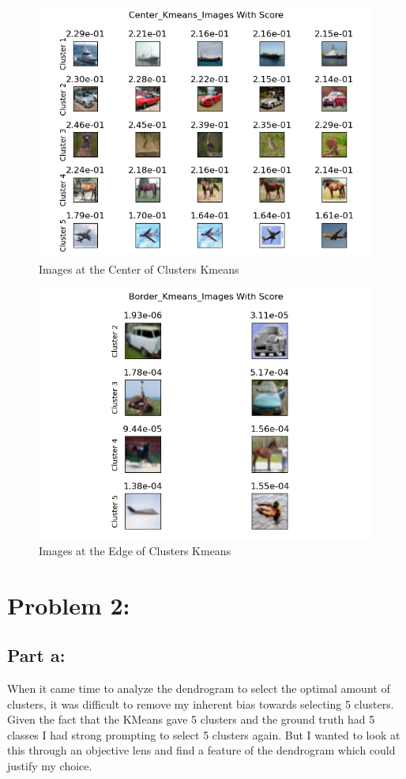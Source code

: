 \documentclass[12pt]{article}
\begin{document}
\begin{figure}
    \includegraphics{../results/kmeans/Center_Kmeans_images.png}
    \caption{Images at the Center of Clusters Kmeans}
    \label{figure2}
\end{figure}
\begin{figure}
    \includegraphics{../results/kmeans/Border_Kmeans_images.png}
    \caption{Images at the Edge of Clusters Kmeans}
    \label{figure3}
\end{figure}

\section{Problem 2:}
\subsection{Part a:}
When it came time to analyze the dendrogram to select the optimal amount of clusters, it was difficult to remove my 
inherent bias towards selecting 5 clusters. Given the fact that the KMeans gave 5 clusters and the ground truth had 5 
classes I had strong prompting to select 5 clusters again. But I wanted to look at this through an objective lens and 
find a feature of the dendrogram which could justify my choice. 
\end{document}

